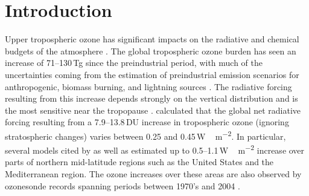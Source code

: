\chapter{Introduction} \label{ch:introduction}

\ifpdf
    \graphicspath{{Chapter_introduction/figures/PNG/}{Chapter_introduction/figures/PDF/}{Chapter_introduction/figures/}}
\else
    \graphicspath{{Chapter_introduction/figures/EPS/}{Chapter_introduction/figures/}}
\fi


Upper tropospheric ozone has significant impacts on the radiative and chemical budgets of the atmosphere \citep{Kiehl:1999uq}. The global tropospheric ozone burden has seen an increase of 71--130\,\unit{Tg} since the preindustrial period, with much of the uncertainties coming from the estimation of preindustrial emission scenarios for anthropogenic, biomass burning, and lightning sources \citep[][and references therein]{Lamarque:2005gb}. The radiative forcing resulting from this increase depends strongly on the vertical distribution and is the most sensitive near the tropopause \citep{Lacis:1990fk}. \citet{Gauss:2006zr} calculated that the global net radiative forcing resulting from a 7.9--13.8\,\unit{DU} increase in tropospheric ozone (ignoring stratospheric changes) varies between 0.25 and 0.45\,\unit{W\,m^{-2}}. In particular, several models cited by \citet{Gauss:2006zr} as well as \citet{Stevenson:1998fk} estimated up to 0.5--1.1\,\unit{W \,m^{-2}} increase over parts of northern mid-latitude regions such as the United States and the Mediterranean region. The ozone increases over these areas are also observed by ozonesonde records spanning periods between 1970's and 2004 \citep{Oltmans:2006kc}.


